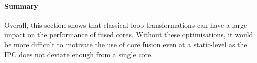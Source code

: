 \paragraph*{Summary}

Overall, this section shows that classical loop transformations can have a large impact on the performance of fused cores.
Without these optimisations, it would be more difficult to motivate the use of core fusion even at a static-level as the IPC does not deviate enough from a single core.
